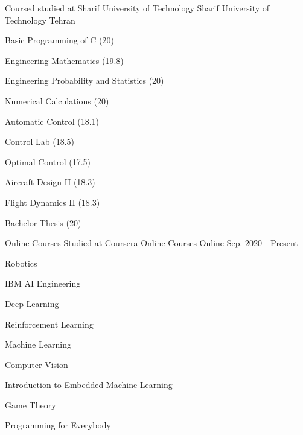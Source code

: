 \vspace{5mm} 

\begin{cventries}
	
	\vspace{1mm} 	
	\cventry
	{Coursed studied at Sharif University of Technology} %
	{Sharif University of Technology} %
	{Tehran}%
	{} %
	{
		\begin{cvitems}
			\item{Basic Programming of C (20)}
			\item{Engineering Mathematics (19.8)}
			\item{Engineering Probability and Statistics (20)}
			\item{Numerical Calculations (20)}
			\item{Automatic Control (18.1)}
			\item{Control Lab (18.5)}
			\item{Optimal Control (17.5)}
			\item{Aircraft Design II (18.3)}
			\item{Flight Dynamics II (18.3)}
			\item{Bachelor Thesis (20)}
		\end{cvitems}
	}
	
	
	\cventry
	{Online Courses Studied at Coursera} %
	{Online Courses} %
	{Online}%
	{Sep. 2020 - Present} %
	{
		\begin{cvitems} %
			\item {Robotics}
			\item{IBM AI Engineering}
			\item{Deep Learning}
			\item{Reinforcement Learning}
			\item{Machine Learning}
			\item{Computer Vision}
			\item{Introduction to Embedded Machine Learning}
			\item{Game Theory}
			\item{Programming for Everybody}
		\end{cvitems}
	}
	
	\vspace{-4.0mm}  
	
	
\end{cventries}
